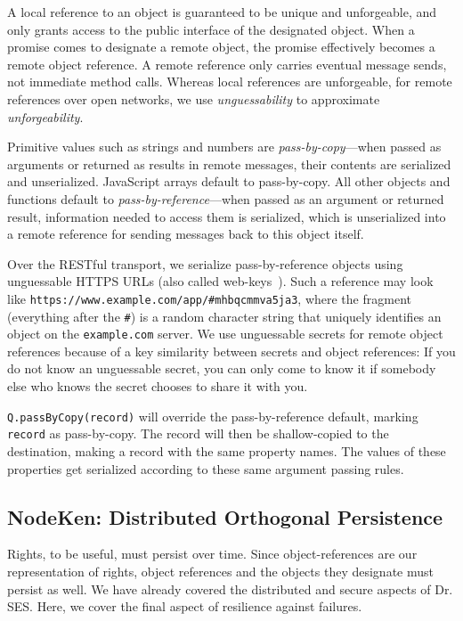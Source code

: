 \documentclass{llncs}
\begin{document}
A local reference to an object is guaranteed to be unique and unforgeable, and only grants access to the public interface of the designated object. When a promise comes to designate a remote object, the promise effectively becomes a remote object reference. A remote reference only carries eventual message sends, not immediate method calls. Whereas local references are unforgeable, for remote references over open networks, we use \emph{unguessability} to approximate \emph{unforgeability}.

Primitive values such as strings and numbers are \emph{pass-by-copy}---when passed as arguments or returned as results in remote messages, their contents are serialized and unserialized. JavaScript arrays default to pass-by-copy. All other objects and functions default to \emph{pass-by-reference}---when passed as an argument or returned result, information needed to access them is serialized, which is unserialized into a remote reference for sending messages back to this object itself.

Over the RESTful transport, we serialize pass-by-reference objects using unguessable HTTPS URLs (also called web-keys~\cite{Close:Webkeys}). Such a reference may look like {\tt https://www.example.com/app/\#mhbqcmmva5ja3}, where the fragment (everything after the {\tt \#}) is a random character string that uniquely identifies an object on the {\tt example.com} server. We use unguessable secrets for remote object references because of a key similarity between secrets and object references: If you do not know an unguessable secret, you can only come to know it if somebody else who knows the secret chooses to share it with you.

\begin{description*}
\item[{\tt Q.passByCopy(record)}] will override the pass-by-reference default, marking {\tt record} as pass-by-copy. The record will then be shallow-copied to the destination, making a record with the same property names. The values of these properties get serialized according to these same argument passing rules.
\end{description*}

\subsection{NodeKen: Distributed Orthogonal Persistence}
\label{NodeKen}

Rights, to be useful, must persist over time. Since object-references are our representation of rights, object references and the objects they designate must persist as well. We have already covered the distributed and secure aspects of Dr. SES. Here, we cover the final aspect of resilience against failures.
\end{document}
